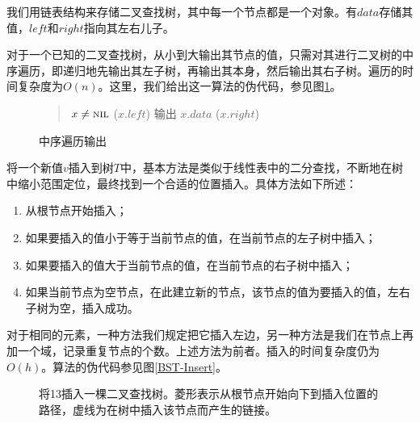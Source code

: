 \documentclass[cs4size,a4paper,nofonts]{ctexart}
\begin{document}
我们用链表结构来存储二叉查找树，其中每一个节点都是一个对象。有$data$存储其值，$left$和$right$指向其左右儿子。

对于一个已知的二叉查找树，从小到大输出其节点的值，只需对其进行二叉树的中序遍历，即递归地先输出其左子树，再输出其本身，然后输出其右子树。遍历的时间复杂度为$O(n)$。这里，我们给出这一算法的伪代码，参见图\ref{BST-Inorder}。

\begin{figure}[htp]
\begin{quote}
\begin{codebox}
\li \If $x\ne\textnormal{\scshape nil}$ \Then
\li   {}($x.left$)
\li   输出 $x.data$
\li   {}($x.right$)
    \End
\end{codebox}
\end{quote}
\caption{\label{BST-Inorder}中序遍历输出}
\end{figure}

将一个新值$v$插入到树$T$中，基本方法是类似于线性表中的二分查找，不断地在树中缩小范围定位，最终找到一个合适的位置插入。具体方法如下所述：
\begin{enumerate}[topsep=0pt,partopsep=0pt,itemsep=0pt,parsep=0pt,label=\arabic*.]
\item 从根节点开始插入；
\item 如果要插入的值小于等于当前节点的值，在当前节点的左子树中插入；
\item 如果要插入的值大于当前节点的值，在当前节点的右子树中插入；
\item 如果当前节点为空节点，在此建立新的节点，该节点的值为要插入的值，左右子树为空，插入成功。
\end{enumerate}

对于相同的元素，一种方法我们规定把它插入左边，另一种方法是我们在节点上再加一个域，记录重复节点的个数。上述方法为前者。插入的时间复杂度仍为$O(h)$。算法的伪代码参见图\ref{BST-Insert}。

\begin{figure}[htbp]
\begin{center}
\def\dedge{\ncline[linestyle=dotted]}
\pstree[levelsep=0.8cm]{\Tdia{12}}{
    \pstree {\Tcircle{5}} {
        \Tcircle{2}
        \Tcircle{9}
    }
    \pstree {\Tdia{18}} {
        \pstree {\Tdia{15}} {
            \Tdia[edge=\dedge]{13}
            \Tcircle{17}
        }
        \Tcircle{19}
    }
}
\end{center}
\caption{\label{iBST}将13插入一棵二叉查找树。菱形表示从根节点开始向下到插入位置的路径，虚线为在树中插入该节点而产生的链接。}
\end{figure}
\end{document}
